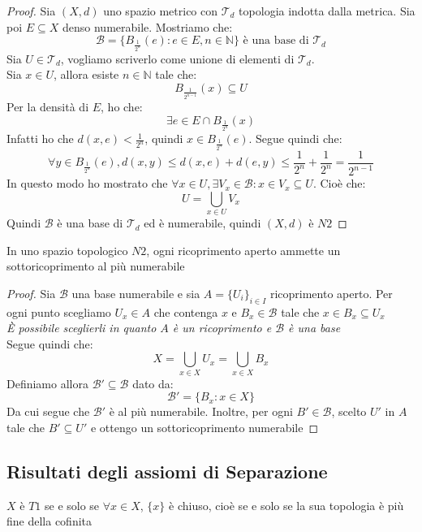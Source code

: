 \documentclass[11pt,a4paper,twoside]{article}
\theoremstyle{definition}
\begin{document}
\begin{proof}
	Sia $(X, d)$ uno spazio metrico con $\mathcal T_d$ topologia indotta dalla metrica. Sia poi $E \subseteq X$ denso numerabile. Mostriamo che:
	\[ \mathcal B = \{ B_{\frac 1{2^n}}(e) : e \in E, n \in \mathbb N \} \text{ è una base di }\mathcal T_d \]
	Sia $U \in \mathcal T_d$, vogliamo scriverlo come unione di elementi di $\mathcal T_d$.\\
	Sia $x \in U$, allora esiste $n \in \mathbb N$ tale che:
	\[B_{\frac 1{2^{n-1}}}(x)\subseteq U\]
	Per la densità di $E$, ho che:
	\[\exists e \in E \cap B_{\frac 1{2^n}}(x)\]
	Infatti ho che $d(x,e)<\frac 1{2^n}$, quindi $x \in B_{\frac 1{2^n}}(e)$. Segue quindi che:
	\[ \forall y \in B_{\frac 1{2^n}}(e), d(x,y)\leq d(x,e) + d(e,y) \leq \frac 1{2^n} + \frac 1{2^n} = \frac 1{2^{n-1}} \]
	In questo modo ho mostrato che $\forall x \in U, \exists V_x \in \mathcal B : x \in V_x \subseteq U$. Cioè che:
	\[ U = \bigcup_{x \in U}V_x \]
	Quindi $\mathcal B$ è una base di $\mathcal T_d$ ed è numerabile, quindi $(X, d)$ è $N2$
\end{proof}

\begin{prop}{}{}
	In uno spazio topologico $N2$, ogni ricoprimento aperto ammette un sottoricoprimento al più numerabile
\end{prop}

\begin{proof}
	Sia $\mathcal B$ una base numerabile e sia $A = \{U_i\}_{i \in I}$ ricoprimento aperto. Per ogni punto scegliamo $U_x \in A$ che contenga $x$ e $B_x \in \mathcal B$ tale che $x \in B_x \subseteq U_x$\\
	\textit{È possibile sceglierli in quanto $A$ è un ricoprimento e $\mathcal B$ è una base}\\
	Segue quindi che:
	\[ X = \bigcup_{x \in X}U_x = \bigcup_{x \in X}B_x \]
	Definiamo allora $\mathcal B' \subseteq \mathcal B$ dato da:
	\[ \mathcal B' = \{B_x : x \in X\}\]
	Da cui segue che $\mathcal B'$ è al più numerabile. Inoltre, per ogni $B' \in \mathcal B$, scelto $U'$ in $A$ tale che $B'\subseteq U'$ e ottengo un sottoricoprimento numerabile
\end{proof}

\subsection{Risultati degli assiomi di Separazione}

\begin{prop}{}{}
	$X$ è $T1$ se e solo se $\forall x \in X$, $\{x\}$ è chiuso, cioè se e solo se la sua topologia è più fine della cofinita
\end{prop}
\end{document}
